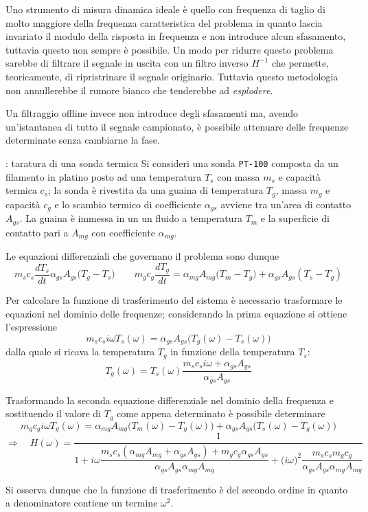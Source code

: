 	Uno strumento di misura dinamica ideale è quello con frequenza di taglio di molto maggiore della frequenza caratteristica del problema in quanto lascia invariato il modulo della risposta in frequenza e non introduce alcun sfasamento, tuttavia questo non sempre è possibile. Un modo per ridurre questo problema sarebbe di filtrare il segnale in uscita con un filtro inverso $H^{-1}$ che permette, teoricamente, di ripristrinare il segnale originario. Tuttavia questo metodologia non annullerebbe il rumore bianco che tenderebbe ad \textit{esplodere}. 
	
	\vspace{3mm}
	Un filtraggio offline invece non introduce degli sfasamenti ma, avendo un'istantanea di tutto il segnale campionato, è possibile attenuare delle frequenze determinate senza cambiarne la fase.
	
	
	
	
	
	\begin{esempio}{: taratura di una sonda termica}
		Si consideri una sonda \texttt{PT-100} composta da un filamento in platino posto ad una temperatura $T_s$ con massa $m_s$ e capacità termica $c_s$; la sonda è rivestita da una guaina di temperatura $T_g$, massa $m_g$ e capacità $c_g$ e lo scambio termico di coefficiente $\alpha_{gs}$ avviene tra un'area di contatto $A_{gs}$. La guaina è immessa in un un fluido a temperatura $T_m$ e la superficie di contatto pari a $A_{mg}$ con coefficiente $\alpha_{mg}$.
		
		Le equazioni differenziali che governano il problema sono dunque
		\[ m_s c_s \frac{dT_s}{dt} \alpha_{gs} A_{gs} \big(T_g -T_s\big) \qquad m_g c_g \frac{dT_g}{dt} = \alpha_{mg} A_{mg} \big(T_m-T_g\big) + \alpha_{gs}A_{gs}(T_s- T_g)\]
		
		Per calcolare la funzione di trasferimento del sistema è necessario trasformare le equazioni nel dominio delle frequenze; considerando la prima equazione si ottiene l'espressione
		\[m_s c_s i\omega T_s(\omega) = \alpha_{gs} A_{gs}\Big( T_{g}(\omega) - T_{s}(\omega)\Big) \]
		dalla quale si ricava la temperatura $T_g$ in funzione della temperatura $T_s$:
		\[ T_g(\omega) = T_s(\omega) \frac{m_s c_s i\omega + \alpha_{gs} A_{gs}}{\alpha_{gs}A_{gs}} \]
		
		Trasformando la seconda equazione differenziale nel dominio della frequenza e sostituendo il valore di $T_g$ come appena determinato è possibile determinare
		\[ m_g c_g i\omega T_g(\omega) = \alpha_{mg} A_{mg} \Big(T_m(\omega) - T_g(\omega)\Big) + \alpha_{gs} A_{gs} \Big(T_s(\omega) - T_g(\omega)\Big) \]
		\[ \Rightarrow \quad H(\omega) = \frac 1 {1 + i\omega \dfrac{m_s c_s (\alpha_{mg} A_{mg} + \alpha_{gs} A_{gs} ) + m_g c_g \alpha_{gs} A_{gs} }{\alpha_{gs} A_{gs}\alpha_{mg} A_{mg} }  + \big(i\omega\big)^2 \dfrac{m_s c_s m_g c_g}{\alpha_{gs} A_{gs} \alpha_{mg} A_{mg} } } \]
		
		Si osserva dunque che la funzione di trasferimento è del secondo ordine in quanto a denominatore contiene un termine $\omega^2$.
		
	\end{esempio}
	
	
	
	
	
	
	
	
	
	
	
	
	
	
	
	
	
	
	
	
	
	
	